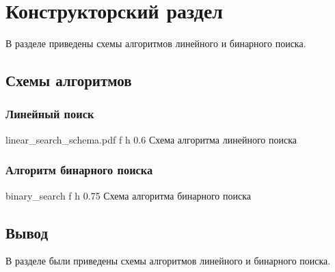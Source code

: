 \chapter{Конструкторский раздел}

В разделе приведены схемы алгоритмов линейного и бинарного поиска.

\section{Схемы алгоритмов}

\subsection{Линейный поиск}

{linear_search_schema.pdf}
{f}
{h}
{0.6 \textwidth}
{Схема алгоритма линейного поиска}

\clearpage

\subsection{Алгоритм бинарного поиска}

{binary_search}
{f}
{h}
{0.75 \textwidth}
{Схема алгоритма бинарного поиска}

\clearpage

\section*{Вывод}

В разделе были приведены схемы алгоритмов линейного и бинарного поиска.